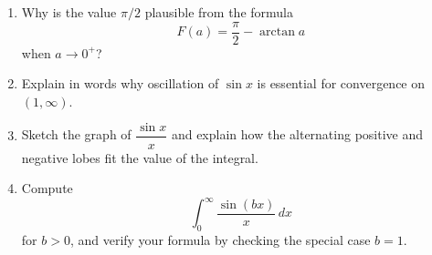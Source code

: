 \begin{enumerate}
  \item Why is the value \(\pi/2\) plausible from the formula
    \[ F(a)=\frac{\pi}{2}-\arctan a \]
    when \(a\to 0^{+}\)?
  \item Explain in words why oscillation of \(\sin x\) is essential for convergence on \((1,\infty)\).
  \item Sketch the graph of \(\dfrac{\sin x}{x}\) and explain how the alternating positive and negative lobes fit the value of the integral.
  \item Compute
    \[ \int_{0}^{\infty} \frac{\sin(bx)}{x}\,dx \]
    for \(b>0\), and verify your formula by checking the special case \(b=1\).
\end{enumerate}
